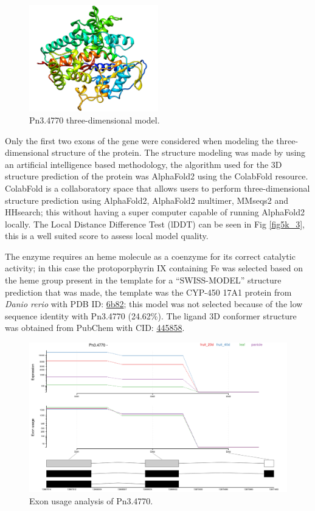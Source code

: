 \documentclass[12pt]{article}
\begin{document}
	\FloatBarrier
	\begin{figure}
		\centering
		\includegraphics[width=0.5\textwidth]{../5/known/Minimize/model2.png}
		\caption{Pn3.4770 three-dimensional model.}
		\label{fig5k_2}
	\end{figure}
	\FloatBarrier
	
	Only the first two exons of the gene were considered when modeling the three-dimensional structure of the protein. The structure modeling was made by using an artificial intelligence based methodology, the algorithm used for the 3D structure prediction of the protein was AlphaFold2 using the ColabFold resource. \cite{alphafold,colabfold} ColabFold is a collaboratory space that allows users to perform three-dimensional structure prediction using AlphaFold2, AlphaFold2 multimer, MMseqs2 and HHsearch; this without having a super computer capable of running AlphaFold2 locally. The Local Distance Difference Test (lDDT) can be seen in Fig \ref{fig5k_3}, this is a well suited score to assess local model quality. \cite{lddt}
	
	The enzyme requires an heme molecule as a coenzyme for its correct catalytic activity; in this case the protoporphyrin IX containing Fe was selected based on the heme group present in the template for a ``SWISS-MODEL'' structure prediction that was made, the template was the CYP-450 17A1 protein from \textit{Danio rerio} with PDB ID: \href{https://www.rcsb.org/structure/6b82}{6b82}; this model was not selected because of the low sequence identity with Pn3.4770 (24.62\%). The ligand 3D conformer structure was obtained from PubChem with CID: \href{https://pubchem.ncbi.nlm.nih.gov/compound/445858}{445858}.
	
	\FloatBarrier
	\begin{figure}
		\centering
		\includegraphics[width=\textwidth-50pt]{../5/known/Transcripts/7.png}
		\caption{Exon usage analysis of Pn3.4770.}
		\label{fig5k_1}
	\end{figure}
	\FloatBarrier
	
\end{document}
